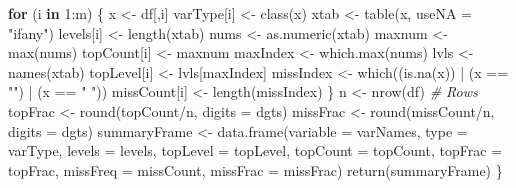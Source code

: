 \documentclass[
]{article}
\newenvironment{Shaded}{\begin{snugshade}}{\end{snugshade}}
\newcommand{\AttributeTok}[1]{\textcolor[rgb]{0.77,0.63,0.00}{#1}}
\newcommand{\CommentTok}[1]{\textcolor[rgb]{0.56,0.35,0.01}{\textit{#1}}}
\newcommand{\ControlFlowTok}[1]{\textcolor[rgb]{0.13,0.29,0.53}{\textbf{#1}}}
\newcommand{\DecValTok}[1]{\textcolor[rgb]{0.00,0.00,0.81}{#1}}
\newcommand{\FunctionTok}[1]{\textcolor[rgb]{0.00,0.00,0.00}{#1}}
\newcommand{\NormalTok}[1]{#1}
\newcommand{\OtherTok}[1]{\textcolor[rgb]{0.56,0.35,0.01}{#1}}
\newcommand{\SpecialCharTok}[1]{\textcolor[rgb]{0.00,0.00,0.00}{#1}}
\newcommand{\StringTok}[1]{\textcolor[rgb]{0.31,0.60,0.02}{#1}}
\begin{document}
\begin{Shaded}
\begin{Highlighting}[]
  \ControlFlowTok{for}\NormalTok{ (i }\ControlFlowTok{in} \DecValTok{1}\SpecialCharTok{:}\NormalTok{m) \{}
\NormalTok{    x }\OtherTok{\textless{}{-}}\NormalTok{ df[,i]}
\NormalTok{    varType[i] }\OtherTok{\textless{}{-}} \FunctionTok{class}\NormalTok{(x)}
\NormalTok{    xtab }\OtherTok{\textless{}{-}} \FunctionTok{table}\NormalTok{(x, }\AttributeTok{useNA =} \StringTok{"ifany"}\NormalTok{)}
\NormalTok{    levels[i] }\OtherTok{\textless{}{-}} \FunctionTok{length}\NormalTok{(xtab)}
\NormalTok{    nums }\OtherTok{\textless{}{-}} \FunctionTok{as.numeric}\NormalTok{(xtab)}
\NormalTok{    maxnum }\OtherTok{\textless{}{-}} \FunctionTok{max}\NormalTok{(nums)}
\NormalTok{    topCount[i] }\OtherTok{\textless{}{-}}\NormalTok{ maxnum}
\NormalTok{    maxIndex }\OtherTok{\textless{}{-}} \FunctionTok{which.max}\NormalTok{(nums)}
\NormalTok{    lvls }\OtherTok{\textless{}{-}} \FunctionTok{names}\NormalTok{(xtab)}
\NormalTok{    topLevel[i] }\OtherTok{\textless{}{-}}\NormalTok{ lvls[maxIndex]}
\NormalTok{    missIndex }\OtherTok{\textless{}{-}} \FunctionTok{which}\NormalTok{((}\FunctionTok{is.na}\NormalTok{(x)) }\SpecialCharTok{|}\NormalTok{ (x }\SpecialCharTok{==} \StringTok{""}\NormalTok{) }\SpecialCharTok{|}\NormalTok{ (x }\SpecialCharTok{==} \StringTok{" "}\NormalTok{))}
\NormalTok{    missCount[i] }\OtherTok{\textless{}{-}} \FunctionTok{length}\NormalTok{(missIndex)}
\NormalTok{  \}}
\NormalTok{  n }\OtherTok{\textless{}{-}} \FunctionTok{nrow}\NormalTok{(df) }\CommentTok{\# Rows}
\NormalTok{  topFrac }\OtherTok{\textless{}{-}} \FunctionTok{round}\NormalTok{(topCount}\SpecialCharTok{/}\NormalTok{n, }\AttributeTok{digits =}\NormalTok{ dgts)}
\NormalTok{  missFrac }\OtherTok{\textless{}{-}} \FunctionTok{round}\NormalTok{(missCount}\SpecialCharTok{/}\NormalTok{n, }\AttributeTok{digits =}\NormalTok{ dgts)}
\NormalTok{  summaryFrame }\OtherTok{\textless{}{-}} \FunctionTok{data.frame}\NormalTok{(}\AttributeTok{variable =}\NormalTok{ varNames, }
                             \AttributeTok{type =}\NormalTok{ varType, }
                             \AttributeTok{levels =}\NormalTok{ levels,}
                             \AttributeTok{topLevel =}\NormalTok{ topLevel,}
                             \AttributeTok{topCount =}\NormalTok{ topCount,}
                             \AttributeTok{topFrac =}\NormalTok{ topFrac,}
                             \AttributeTok{missFreq =}\NormalTok{ missCount,}
                             \AttributeTok{missFrac =}\NormalTok{ missFrac)}
  \FunctionTok{return}\NormalTok{(summaryFrame)}
\NormalTok{\}}
\end{Highlighting}
\end{Shaded}
\end{document}
